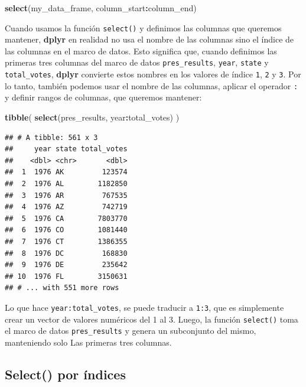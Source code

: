 \documentclass[
]{book}
\newenvironment{Shaded}{\begin{snugshade}}{\end{snugshade}}
\newcommand{\KeywordTok}[1]{\textcolor[rgb]{0.13,0.29,0.53}{\textbf{#1}}}
\newcommand{\NormalTok}[1]{#1}
\newcommand{\OperatorTok}[1]{\textcolor[rgb]{0.81,0.36,0.00}{\textbf{#1}}}
\begin{document}
\begin{Shaded}
\begin{Highlighting}[]
\KeywordTok{select}\NormalTok{(my_data_frame, column_start}\OperatorTok{:}\NormalTok{column_end)}
\end{Highlighting}
\end{Shaded}

Cuando usamos la función \texttt{select()} y definimos las columnas que queremos mantener, \textbf{dplyr} en realidad no usa el nombre de las columnas sino el índice de las columnas en el marco de datos. Esto significa que, cuando definimos las primeras tres columnas del marco de datos \texttt{pres\_results}, \texttt{year}, \texttt{state} y \texttt{total\_votes}, \textbf{dplyr} convierte estos nombres en los valores de índice \texttt{1}, \texttt{2} y \texttt{3}. Por lo tanto, también podemos usar el nombre de las columnas, aplicar el operador \texttt{:} y definir rangos de columnas, que queremos mantener:

\begin{Shaded}
\begin{Highlighting}[]
\KeywordTok{tibble}\NormalTok{(}
\KeywordTok{select}\NormalTok{(pres_results, year}\OperatorTok{:}\NormalTok{total_votes)}
\NormalTok{)}
\end{Highlighting}
\end{Shaded}

\begin{verbatim}
## # A tibble: 561 x 3
##     year state total_votes
##    <dbl> <chr>       <dbl>
##  1  1976 AK         123574
##  2  1976 AL        1182850
##  3  1976 AR         767535
##  4  1976 AZ         742719
##  5  1976 CA        7803770
##  6  1976 CO        1081440
##  7  1976 CT        1386355
##  8  1976 DC         168830
##  9  1976 DE         235642
## 10  1976 FL        3150631
## # ... with 551 more rows
\end{verbatim}

Lo que hace \texttt{year:total\_votes}, se puede traducir a \texttt{1:3}, que es simplemente crear un vector de valores numéricos del 1 al 3. Luego, la función \texttt{select()} toma el marco de datos \texttt{pres\_results} y genera un subconjunto del mismo, manteniendo solo Las primeras tres columnas.

\hypertarget{select-por-uxedndices}{%
\subsection{Select() por índices}\label{select-por-uxedndices}}
\end{document}
